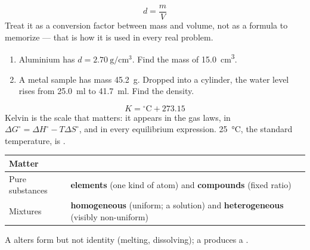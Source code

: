 \documentclass{apchem-notes}
\begin{document}

\[ d = \frac{m}{V} \]
Treat it as a conversion factor between mass and volume, not as a formula to
memorize --- that is how it is used in every real problem.

\begin{enumerate}[leftmargin=*,itemsep=0.4em]
  \item Aluminium has $d = \SI{2.70}{\gram\per\centi\metre\cubed}$. Find
        the mass of \SI{15.0}{\centi\metre\cubed}. \workspace[1.8cm]
  \item A metal sample has mass \SI{45.2}{\gram}. Dropped into a cylinder,
        the water level rises from \SI{25.0}{\milli\litre} to
        \SI{41.7}{\milli\litre}. Find the density. \workspace[2.4cm]
\end{enumerate}


\[ K = {}^\circ\text{C} + 273.15 \]
Kelvin is the scale that matters: it appears in the gas laws, in
$\Delta G^\circ = \Delta H^\circ - T\Delta S^\circ$, and in every
equilibrium expression. \SI{25}{\celsius}, the standard temperature, is
.

\begin{center}
\begin{tabular}{@{}ll@{}}
\hline
\textbf{Matter} & \\
\hline
\quad Pure substances & \textbf{elements} (one kind of atom) and
  \textbf{compounds} (fixed ratio) \\
\quad Mixtures & \textbf{homogeneous} (uniform; a solution) and
  \textbf{heterogeneous} (visibly non-uniform) \\
\hline
\end{tabular}
\end{center}

A  alters form but not identity (melting, dissolving);
a  produces a
.
\end{document}
